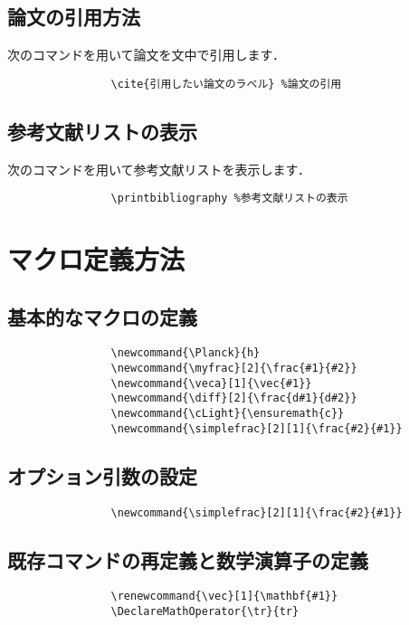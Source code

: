         \subsection{論文の引用方法}
        次のコマンドを用いて論文を文中で引用します．
            \begin{verbatim}
                \cite{引用したい論文のラベル} %論文の引用
            \end{verbatim}

        \subsection{参考文献リストの表示}
        次のコマンドを用いて参考文献リストを表示します．
            \begin{verbatim}
                \printbibliography %参考文献リストの表示
            \end{verbatim}

    \section{マクロ定義方法}
        \subsection{基本的なマクロの定義}
            \begin{verbatim}
                \newcommand{\Planck}{h}
                \newcommand{\myfrac}[2]{\frac{#1}{#2}}
                \newcommand{\veca}[1]{\vec{#1}}
                \newcommand{\diff}[2]{\frac{d#1}{d#2}}
                \newcommand{\cLight}{\ensuremath{c}}
                \newcommand{\simplefrac}[2][1]{\frac{#2}{#1}}
            \end{verbatim}

        \subsection{オプション引数の設定}
            \begin{verbatim}
                \newcommand{\simplefrac}[2][1]{\frac{#2}{#1}}
            \end{verbatim}

        \subsection{既存コマンドの再定義と数学演算子の定義}
            \begin{verbatim}
                \renewcommand{\vec}[1]{\mathbf{#1}}
                \DeclareMathOperator{\tr}{tr}
            \end{verbatim}

